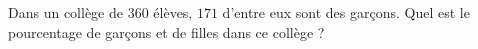 
\begin{exercice}\label{exo2smath-0121}

Dans un collège de $360$ élèves, $171$ d'entre eux sont des garçons. Quel est le pourcentage de garçons et de filles dans ce collège ?

\end{exercice}
